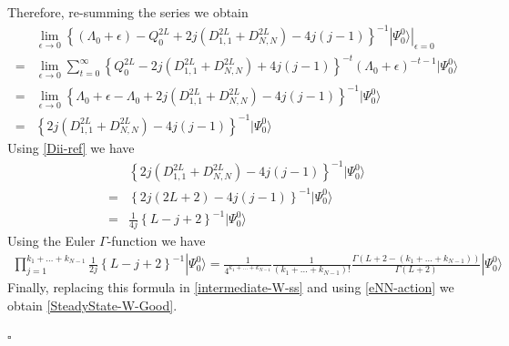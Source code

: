 \documentclass[10pt]{article}
\numberwithin{equation}{section}
\numberwithin{equation}{subsection}
\begin{document}
Therefore, re-summing the series we obtain
\begin{align}
	&\lim_{\epsilon\to 0}\left\{(\Lambda_{0}+\epsilon)-Q_{0}^{2L}+2j(D_{1,1}^{2L}+D_{N,N}^{2L})-4j(j-1)\right\}^{-1}|\Psi_{0}^{0}\rangle|_{\epsilon=0}\nonumber
	\\=&
	\lim_{\epsilon\to 0}\sum_{t=0}^{\infty}\left\{Q_{0}^{2L}-2j(D_{1,1}^{2L}+D_{N,N}^{2L})+4j(j-1)\right\}^{-t}\left(\Lambda_{0}+\epsilon\right)^{-t-1}|\Psi_{0}^{0}\rangle\nonumber
	\\=&
	\lim_{\epsilon\to 0}\left\{\Lambda_{0}+\epsilon-\Lambda_{0}+2j(D_{1,1}^{2L}+D_{N,N}^{2L})-4j(j-1)\right\}^{-1}|\Psi_{0}^{0}\rangle\nonumber
	\\=&
	\left\{2j(D_{1,1}^{2L}+D_{N,N}^{2L})-4j(j-1)\right\}^{-1}|\Psi_{0}^{0}\rangle
\end{align}
Using \eqref{Dii-ref} we have 
\begin{align}
	&\left\{2j(D_{1,1}^{2L}+D_{N,N}^{2L})-4j(j-1)\right\}^{-1}|\Psi_{0}^{0}\rangle\nonumber
	\\=&\left\{2j(2L+2)-4j(j-1)\right\}^{-1}|\Psi_{0}^{0}\rangle\nonumber
	\\=&
	\frac{1}{4j}\left\{L-j+2\right\}^{-1}|\Psi_{0}^{0}\rangle
\end{align}
Using the Euler $\Gamma$-function we have 
\begin{align}
\prod_{j=1}^{k_{1}+\ldots+k_{N-1}}\frac{1}{2j}\left\{L-j+2\right\}^{-1}|\Psi_{0}^{0}\rangle=\frac{1}{4^{k_{1}+\ldots+k_{N-1}}}\frac{1}{(k_{1}+\ldots+k_{N-1})!}\frac{\Gamma(L+2-(k_{1}+\ldots+k_{N-1}))}{\Gamma(L+2)}|\Psi_{0}^{0}\rangle
\end{align}
Finally, replacing this formula in \eqref{intermediate-W-ss} and using \eqref{eNN-action} we obtain \eqref{SteadyState-W-Good}. 
\begin{flushright}
	$\square$
\end{flushright}
\end{document}
